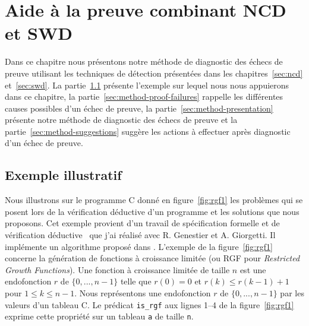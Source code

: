 
\chapter{Aide à la preuve combinant NCD et SWD}
\label{sec:method}

\chapterintro


Dans ce chapitre nous présentons notre méthode de diagnostic des échecs de
preuve utilisant les techniques de détection présentées dans les
chapitres~\ref{sec:ncd} et~\ref{sec:swd}.
La partie~\ref{sec:method-ex} présente l'exemple sur lequel nous nous
appuierons dans ce chapitre, la partie~\ref{sec:method-proof-failures} rappelle
les différentes causes possibles d'un échec de preuve, la
partie~\ref{sec:method-presentation} présente notre méthode de diagnostic des
échecs de preuve et la partie~\ref{sec:method-suggestions} suggère les actions
à effectuer après diagnostic d'un échec de preuve.


\section{Exemple illustratif}
\label{sec:method-ex}


Nous illustrons sur le programme C donné en figure~\ref{fig:rgf1} les problèmes
qui se posent lors de la vérification déductive d'un programme et les solutions
que nous proposons.
Cet exemple provient d'un travail de spécification formelle et de vérification
déductive~\cite{Genestier/TAP15} que j'ai réalisé avec R. Genestier et
A. Giorgetti.
Il implémente un algorithme proposé dans \cite[page 235]{Arndt/10}.
L'exemple de la figure~\ref{fig:rgf1} concerne la génération de fonctions à
croissance limitée (ou RGF pour \textit{Restricted Growth Functions}).
Une fonction à croissance limitée de taille $n$ est une endofonction $r$ de
$\{0, ..., n-1\}$ telle que $r(0) = 0$ et $r(k) \le r(k-1)+1$ pour
$1 \le k \le n-1$.
Nous représentons une endofonction $r$ de $\{0, ..., n-1\}$ par les valeurs d'un
tableau C.
Le prédicat \acsl \lstinline{is_rgf} aux lignes 1--4 de la figure~\ref{fig:rgf1}
exprime cette propriété sur un tableau \lstinline'a' de taille \lstinline'n'.


